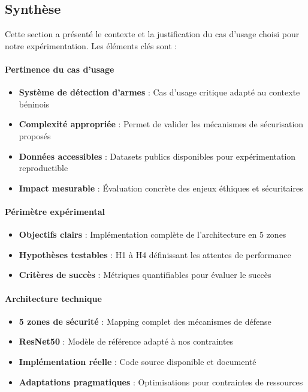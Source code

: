 \subsection*{Synthèse}

Cette section a présenté le contexte et la justification du cas d'usage choisi pour notre expérimentation. Les éléments clés sont :

\paragraph{Pertinence du cas d'usage}
\begin{itemize}
    \item \textbf{Système de détection d'armes} : Cas d'usage critique adapté au contexte béninois
    \item \textbf{Complexité appropriée} : Permet de valider les mécanismes de sécurisation proposés
    \item \textbf{Données accessibles} : Datasets publics disponibles pour expérimentation reproductible
    \item \textbf{Impact mesurable} : Évaluation concrète des enjeux éthiques et sécuritaires
\end{itemize}

\paragraph{Périmètre expérimental}
\begin{itemize}
    \item \textbf{Objectifs clairs} : Implémentation complète de l'architecture en 5 zones
    \item \textbf{Hypothèses testables} : H1 à H4 définissant les attentes de performance
    \item \textbf{Critères de succès} : Métriques quantifiables pour évaluer le succès
\end{itemize}

\paragraph{Architecture technique}
\begin{itemize}
    \item \textbf{5 zones de sécurité} : Mapping complet des mécanismes de défense
    \item \textbf{ResNet50} : Modèle de référence adapté à nos contraintes
    \item \textbf{Implémentation réelle} : Code source disponible et documenté
    \item \textbf{Adaptations pragmatiques} : Optimisations pour contraintes de ressources
\end{itemize}

